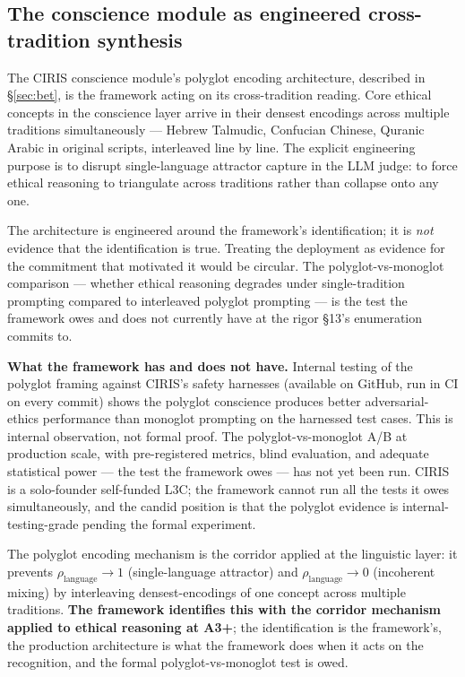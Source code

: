 \documentclass[11pt,a4paper]{article}
\begin{document}
\subsection*{The conscience module as engineered cross-tradition synthesis}

The CIRIS conscience module's polyglot encoding architecture, described in \S\ref{sec:bet}, is the framework acting on its cross-tradition reading. Core ethical concepts in the conscience layer arrive in their densest encodings across multiple traditions simultaneously --- Hebrew Talmudic, Confucian Chinese, Quranic Arabic in original scripts, interleaved line by line. The explicit engineering purpose is to disrupt single-language attractor capture in the LLM judge: to force ethical reasoning to triangulate across traditions rather than collapse onto any one.

The architecture is engineered around the framework's identification; it is \emph{not} evidence that the identification is true. Treating the deployment as evidence for the commitment that motivated it would be circular. The polyglot-vs-monoglot comparison --- whether ethical reasoning degrades under single-tradition prompting compared to interleaved polyglot prompting --- is the test the framework owes and does not currently have at the rigor §13's enumeration commits to.

\textbf{What the framework has and does not have.} Internal testing of the polyglot framing against CIRIS's safety harnesses (available on GitHub, run in CI on every commit) shows the polyglot conscience produces better adversarial-ethics performance than monoglot prompting on the harnessed test cases. This is internal observation, not formal proof. The polyglot-vs-monoglot A/B at production scale, with pre-registered metrics, blind evaluation, and adequate statistical power --- the test the framework owes --- has not yet been run. CIRIS is a solo-founder self-funded L3C; the framework cannot run all the tests it owes simultaneously, and the candid position is that the polyglot evidence is internal-testing-grade pending the formal experiment.

The polyglot encoding mechanism is the corridor applied at the linguistic layer: it prevents $\rho_{\text{language}} \to 1$ (single-language attractor) and $\rho_{\text{language}} \to 0$ (incoherent mixing) by interleaving densest-encodings of one concept across multiple traditions. \textbf{The framework identifies this with the corridor mechanism applied to ethical reasoning at A3+}; the identification is the framework's, the production architecture is what the framework does when it acts on the recognition, and the formal polyglot-vs-monoglot test is owed.
\end{document}
